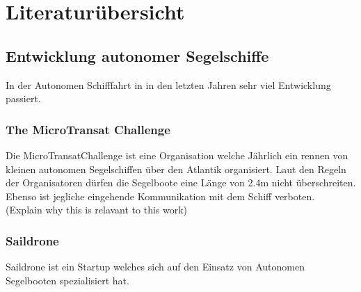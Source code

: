 

\chapter{Literaturübersicht }
\label{chap:literaturübersicht}


\section{Entwicklung autonomer Segelschiffe}
In der Autonomen Schifffahrt in in den letzten Jahren sehr viel Entwicklung passiert. 
\subsection{The MicroTransat Challenge}
Die MicroTransatChallenge ist eine Organisation welche Jährlich ein rennen von kleinen autonomen Segelschiffen über den Atlantik organisiert. \cite{noauthor_microtransat_nodate}
Laut den Regeln der Organisatoren dürfen die Segelboote eine Länge von 2.4m nicht überschreiten. Ebenso ist jegliche eingehende Kommunikation mit dem Schiff verboten. 
\\
(Explain why this is relavant to this work)


\subsection{Saildrone}
Saildrone ist ein Startup welches sich auf den Einsatz von Autonomen Segelbooten spezialisiert hat. 
